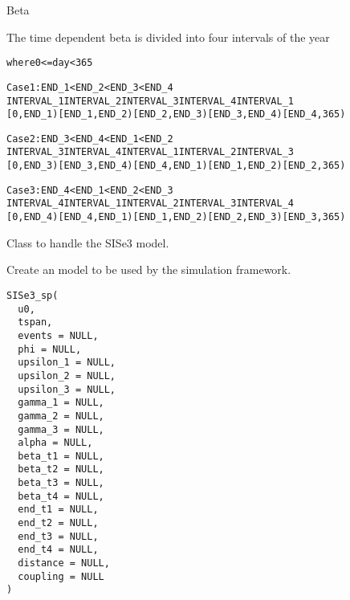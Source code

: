 \documentclass[letterpaper]{book}
\begin{document}
%
\begin{Value}
\end{Value}
%
\begin{Section}{Beta}

The time dependent beta is divided into four intervals of the year
\begin{alltt}
where 0 <= day < 365

Case 1: END_1 < END_2 < END_3 < END_4
INTERVAL_1 INTERVAL_2     INTERVAL_3     INTERVAL_4     INTERVAL_1
[0, END_1) [END_1, END_2) [END_2, END_3) [END_3, END_4) [END_4, 365)

Case 2: END_3 < END_4 < END_1 < END_2
INTERVAL_3 INTERVAL_4     INTERVAL_1     INTERVAL_2     INTERVAL_3
[0, END_3) [END_3, END_4) [END_4, END_1) [END_1, END_2) [END_2, 365)

Case 3: END_4 < END_1 < END_2 < END_3
INTERVAL_4 INTERVAL_1     INTERVAL_2     INTERVAL_3     INTERVAL_4
[0, END_4) [END_4, END_1) [END_1, END_2) [END_2, END_3) [END_3, 365)
\end{alltt}

\end{Section}
%
\begin{Description}
Class to handle the SISe3  model.
\end{Description}
%
\begin{Description}
Create an  model to be used by the simulation
framework.
\end{Description}
%
\begin{Usage}
\begin{verbatim}
SISe3_sp(
  u0,
  tspan,
  events = NULL,
  phi = NULL,
  upsilon_1 = NULL,
  upsilon_2 = NULL,
  upsilon_3 = NULL,
  gamma_1 = NULL,
  gamma_2 = NULL,
  gamma_3 = NULL,
  alpha = NULL,
  beta_t1 = NULL,
  beta_t2 = NULL,
  beta_t3 = NULL,
  beta_t4 = NULL,
  end_t1 = NULL,
  end_t2 = NULL,
  end_t3 = NULL,
  end_t4 = NULL,
  distance = NULL,
  coupling = NULL
)
\end{verbatim}
\end{Usage}
%
\end{document}
